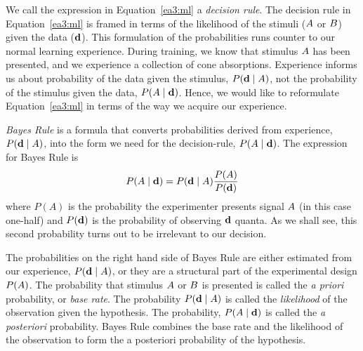 We call the expression in Equation~\ref{ea3:ml} a {\em decision rule}.
The decision rule in Equation~\ref{ea3:ml} is framed in terms of the
likelihood of the stimuli ($\mbox{$A$}$ or $\mbox{$B$}$) given the data
($\mbox{${\bf d}$}$).  This formulation of the probabilities runs counter to our
normal learning experience.  During training, we know that stimulus
$\mbox{$A$}$ has been presented, and we experience a collection of cone
absorptions.  Experience informs us about probability of the data
given the stimulus, $P(\mbox{${\bf d}$} \mid \mbox{$A$})$, not the probability of the
stimulus given the data, $P(\mbox{$A$} \mid \mbox{${\bf d}$})$.  Hence, we would like
to reformulate Equation~\ref{ea3:ml} in terms of the way we acquire
our experience.

{\em Bayes Rule} is a formula that converts probabilities derived from
experience, $P(\mbox{${\bf d}$} \mid \mbox{$A$})$, into the form we need for the
decision-rule, $P(\mbox{$A$} \mid \mbox{${\bf d}$})$.  The expression for Bayes
Rule is
\begin{equation}
\label{ea3:BayesRule}
P(\mbox{$A$}  \mid  \mbox{${\bf d}$} ) = 
 {P ( \mbox{${\bf d}$}  \mid  \mbox{$A$} )}  \frac{ P ( A ) }{ P ( \mbox{${\bf d}$} ) }
\end{equation}
where $P(A)$ is the probability the experimenter presents signal
$\mbox{$A$}$ (in this case one-half) and $P(\mbox{${\bf d}$})$ is the probability of
observing $\mbox{${\bf d}$}$ quanta.  As we shall see, this second probability
turns out to be irrelevant to our decision.

The probabilities on the right hand side of Bayes Rule are either
estimated from our experience, $P(\mbox{${\bf d}$} \mid \mbox{$A$})$, or they are a
structural part of the experimental design $P(\mbox{$A$})$.  The
probability that stimulus $\mbox{$A$}$ or $\mbox{$B$}$ is presented is called
the {\em a priori} probability, or {\em base rate}.  The probability
$P(\mbox{${\bf d}$} \mid \mbox{$A$})$ is called the {\em likelihood} of the
observation given the hypothesis.  The probability, $P(\mbox{$A$} \mid
\mbox{${\bf d}$})$ is called the {\em a posteriori} probability.  Bayes Rule
combines the base rate and the likelihood of the observation to form
the a posteriori probability of the hypothesis.

